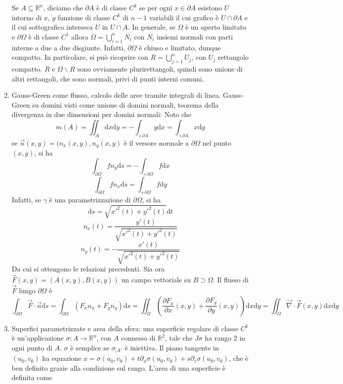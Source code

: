 \documentclass[a4paper,11pt]{article}
\begin{document}
\begin{enumerate}
	Se $A\subseteq\mathbb{R}^n$, diciamo che $\partial A$ è di classe $C^k$ se per ogni $x\in\partial A$ esistono $U$ intorno di $x$, $g$ funzione di classe $C^k$ di $n-1$ variabili il cui grafico è $U\cap\partial A$ e il cui sottografico interseca $U$ in $U\cap A$.
	In generale, se $\Omega$ è un aperto limitato e $\partial\Omega$ è di classe $C^1$ allora $\overline{\Omega}=\bigcup_{i=1}^{n}N_i$ con $N_i$ insiemi normali con parti interne a due a due disgiunte. Infatti, $\partial\Omega$ è chiuso e limitato, dunque compatto. In particolare, si può ricoprire con $R=\bigcup_{j=1}^{n} U_j$, con $U_j$ rettangolo compatto. $R$ e $\Omega\backslash R$ sono ovviamente plurirettangoli, quindi sono unione di altri rettangoli, che sono normali, privi di punti interni comuni.	
	\item Gauss-Green come flusso, calcolo delle aree tramite integrali di linea. Gauss-Green su domini visti come unione di domini normali, teorema della divergenza in due dimensioni per domini normali: 
	Noto che
	\[m(A)=\iint_A\mathrm{d}x\mathrm{d}y=-\int_{+\partial A}y\mathrm{d}x=\int_{+\partial A}x\mathrm{d}y\]
	se $\vec{n}(x,y)=(n_x(x,y),n_y(x,y)$ è il versore normale a $\partial \Omega$ nel punto $(x,y)$, si ha
	\[\int_{\partial \Omega}fn_y\mathrm{d}s=-\int_{+\partial\Omega}f\mathrm{d}x\]
	\[\int_{\partial\Omega}fn_x\mathrm{d}s=\int_{+\partial\Omega}f\mathrm{d}y\]
	Infatti, se $\gamma$ è una parametrizzazione di $\partial\Omega$, si ha
	\[\mathrm{d}s=\sqrt{x'^2(t)+y'^2(t)}\mathrm{d}t\]
	\[n_x(t)=\frac{y'(t)}{\sqrt{x'^2(t)+y'^2(t)}}\]
	\[n_y(t)=-\frac{x'(t)}{\sqrt{x'^2(t)+y'^2(t)}}\]
	Da cui si ottengono le relazioni precedenti. Sia ora $\vec{F}(x,y)=(A(x,y),B(x,y))$ un campo vettoriale su $B\supset\Omega$. Il flusso di $\vec{F}$ lungo $\partial\Omega$ è
	\[\int_{\partial\Omega}\vec{F}\cdot\vec{n}\mathrm{d}s=\int_{\partial\Omega}\left(F_xn_x+F_yn_y\right)\mathrm{d}s=\iint_{\Omega}\left(\frac{\partial F_x}{\partial x}(x,y)+\frac{\partial F_y}{\partial y}(x,y)\right)\mathrm{d}x\mathrm{d}y=\iint_\Omega\vec{\nabla}\cdot\vec{F}(x,y)\mathrm{d}x\mathrm{d}y\]
	\item Superfici parametrizzate e area della sfera: una superficie regolare di classe $C^k$ è un'applicazione $\sigma\colon A\to\mathbb{R}^n$, con $A$ connesso di $\mathbb{R}^2$, tale che $J\sigma$ ha rango 2 in ogni punto di $A$. $\sigma$ è semplice se $\sigma_{|A^\circ}$ è iniettiva. Il piano tangente in $(u_0,v_0)$ ha equazione $x=\sigma(u_0,v_0)+t\partial_u\sigma(u_0,v_0)+s\partial_v\sigma(u_0,v_0)$, che è ben definito grazie alla condizione sul rango. L'area di una superficie è definita come

\end{enumerate}
\end{document}
